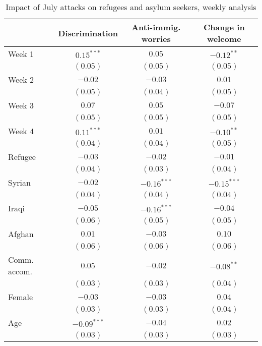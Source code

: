 
\begin{table}
\caption{Impact of July attacks on refugees and asylum seekers, weekly analysis}
\begin{center}
\begin{tabular}{l c c c}
\toprule
 & Discrimination & Anti-immig. worries & Change in welcome \\
\midrule
Week 1        & $0.15^{***}$  & $0.05$        & $-0.12^{**}$  \\
              & $(0.05)$      & $(0.05)$      & $(0.05)$      \\
Week 2        & $-0.02$       & $-0.03$       & $0.01$        \\
              & $(0.05)$      & $(0.04)$      & $(0.05)$      \\
Week 3        & $0.07$        & $0.05$        & $-0.07$       \\
              & $(0.05)$      & $(0.05)$      & $(0.05)$      \\
Week 4        & $0.11^{***}$  & $0.01$        & $-0.10^{**}$  \\
              & $(0.04)$      & $(0.04)$      & $(0.05)$      \\
Refugee       & $-0.03$       & $-0.02$       & $-0.01$       \\
              & $(0.04)$      & $(0.03)$      & $(0.04)$      \\
Syrian        & $-0.02$       & $-0.16^{***}$ & $-0.15^{***}$ \\
              & $(0.04)$      & $(0.04)$      & $(0.04)$      \\
Iraqi         & $-0.05$       & $-0.16^{***}$ & $-0.04$       \\
              & $(0.06)$      & $(0.05)$      & $(0.05)$      \\
Afghan        & $0.01$        & $-0.03$       & $0.10$        \\
              & $(0.06)$      & $(0.06)$      & $(0.06)$      \\
Comm. accom.  & $0.05$        & $-0.02$       & $-0.08^{**}$  \\
              & $(0.03)$      & $(0.03)$      & $(0.04)$      \\
Female        & $-0.03$       & $-0.03$       & $0.04$        \\
              & $(0.03)$      & $(0.03)$      & $(0.04)$      \\
Age           & $-0.09^{***}$ & $-0.04$       & $0.02$        \\
              & $(0.03)$      & $(0.03)$      & $(0.03)$      \\

\end{tabular}
\end{center}
\end{table}
